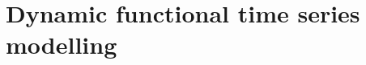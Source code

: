 
\chapter{Dynamic functional time series modelling \label{cha:dftsm}}  %

\ifpdf
    \graphicspath{{Chapter4/Figs/Raster/}{Chapter4/Figs/PDF/}{Chapter4/Figs/}}
\else
    \graphicspath{{Chapter4/Figs/Vector/}{Chapter4/Figs/}}
\fi